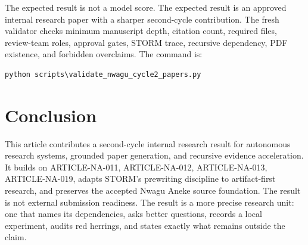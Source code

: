 \documentclass[sigconf,nonacm]{acmart}
\begin{document}
The expected result is not a model score. The expected result is an approved
internal research paper with a sharper second-cycle contribution. The fresh
validator checks minimum manuscript depth, citation count, required files,
review-team roles, approval gates, STORM trace, recursive dependency, PDF
existence, and forbidden overclaims. The command is:
\begin{verbatim}
python scripts\validate_nwagu_cycle2_papers.py
\end{verbatim}

\section{Conclusion}
This article contributes a second-cycle internal research result for autonomous research systems, grounded paper generation, and recursive evidence acceleration. It
builds on ARTICLE-NA-011, ARTICLE-NA-012, ARTICLE-NA-013, ARTICLE-NA-019, adapts STORM's prewriting discipline to artifact-first
research, and preserves the accepted Nwagu Aneke source foundation. The result
is not external submission readiness. The result is a more precise research unit:
one that names its dependencies, asks better questions, records a local
experiment, audits red herrings, and states exactly what remains outside the
claim.



\end{document}
